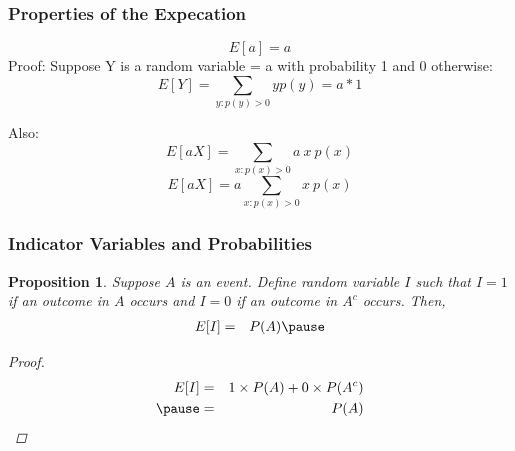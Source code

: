 \documentclass[handout]{beamer}
\newtheorem{prop}{Proposition}
\numberwithin{equation}{section}
\begin{document}
\begin{frame}
\frametitle{Properties of the Expecation}
$$E[a]=a$$\pause 
Proof:  Suppose Y is a random variable = a with probability 1 and 0 otherwise:
$$E[Y] = \sum_{y: p(y)>0} y p(y) = a * 1 $$  \pause 

Also: 
$$E[aX] = \sum_{x: p(x)>0} a\ x\  p(x) $$  \pause 
$$E[aX] = a \sum_{x: p(x)>0} x\  p(x) $$  \pause
\end{frame}


\begin{frame}
\frametitle{Indicator Variables and Probabilities} 

\pause 
\begin{prop}\pause 
Suppose $A$ is an event.  Define random variable $I$ such that $I= 1$ if an outcome in $A$ occurs and $I =0$ if an outcome in $A^{c}$ occurs.  Then,  \pause 
\begin{eqnarray}
E[I] &  = &  P(A)\nonumber  \pause 
\end{eqnarray}

\begin{proof}  \pause 
\begin{eqnarray}
E[I]  & =&  1 \times P(A) + 0 \times P(A^{c}) \nonumber \\ \pause 
 & = & P(A) \nonumber 
\end{eqnarray} 
\end{proof}


\end{prop}

\end{frame}
\end{document}
